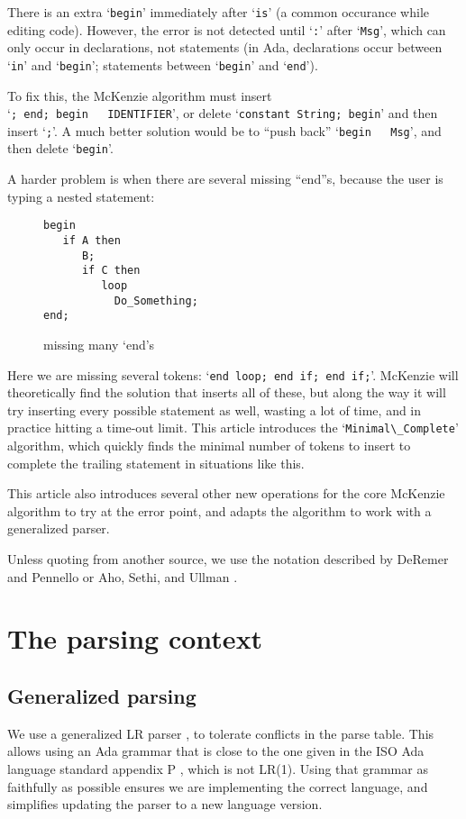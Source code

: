 \documentclass{article}
\newcommand{\code}[1]{`\lstinline|#1|'}
\begin{document}
There is an extra \code{begin} immediately after \code{is} (a common
occurance while editing code). However, the error is not detected
until \code{:} after \code{Msg}, which can only occur in declarations,
not statements (in Ada, declarations occur between \code{in} and
\code{begin}; statements between \code{begin} and \code{end}).

To fix this, the McKenzie algorithm must insert\\ \code{; end; begin
  IDENTIFIER}, or delete \code{constant String; begin} and then insert
\code{;}. A much better solution would be to ``push back'' \code{begin
  Msg}, and then delete \code{begin}.

A harder problem is when there are several missing ``end''s, because
the user is typing a nested statement:
\begin{figure}[H]
\begin{lstlisting}
begin
   if A then
      B;
      if C then
         loop
           Do_Something;
end;
\end{lstlisting}
\caption{missing many `end's}
\label{ex:min_com_if_if_loop}
\end{figure}

Here we are missing several tokens: \code{end loop; end if; end if;}.
McKenzie will theoretically find the solution that inserts all of
these, but along the way it will try inserting every possible
statement as well, wasting a lot of time, and in practice hitting a
time-out limit. This article introduces the \code{Minimal\_Complete}
algorithm, which quickly finds the minimal number of tokens to insert
to complete the trailing statement in situations like this.

This article also introduces several other new operations for the core
McKenzie algorithm to try at the error point, and adapts the algorithm
to work with a generalized parser.

Unless quoting from another source, we use the notation described by
DeRemer and Pennello \cite{DeRemer 1982} or Aho, Sethi, and Ullman
\cite{dragon}.

\section{The parsing context}
\subsection{Generalized parsing}
We use a generalized LR parser \cite{Tomita 1986}, to tolerate
conflicts in the parse table. This allows using an Ada grammar that is
close to the one given in the ISO Ada language standard appendix P
\cite{Ada 2012}, which is not LR(1). Using that grammar as faithfully
as possible ensures we are implementing the correct language, and
simplifies updating the parser to a new language version.
\end{document}
